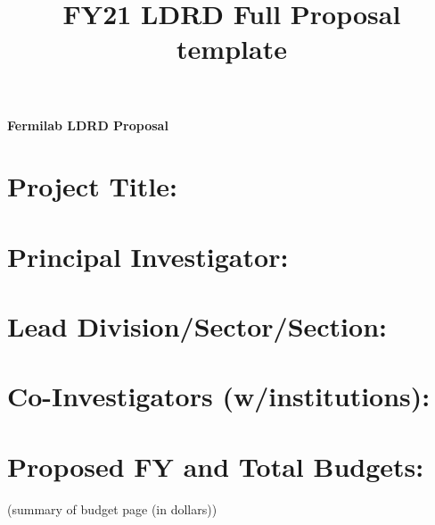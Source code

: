 \documentclass[11pt]{article}
\title{FY21 LDRD Full Proposal template}
\begin{document}
\begin{center}
\normalfont\Large\bfseries Fermilab LDRD Proposal
\end{center}
\section*{Project Title:}

\section*{Principal Investigator:}

\section*{Lead Division/Sector/Section:}

\section*{Co-Investigators (w/institutions):}



\section*{Proposed FY and Total Budgets:} (summary of budget page (in dollars)) 

\begin{table}[h]
\end{table}
\end{document}
